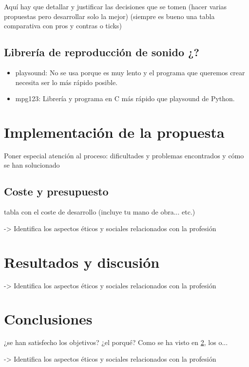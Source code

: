 \documentclass{article}
\begin{document}
 Aquí hay que detallar y justificar las decisiones que se tomen (hacer varias propuestas pero desarrollar solo la mejor) (siempre es bueno una tabla comparativa con pros y contras o ticks)
 
 \subsection{Librería de reproducción de sonido ¿?}
 \begin{itemize}
     \item playsound\cite{playsound}: No se usa porque es muy lento y el programa que queremos crear necesita ser lo más rápido posible.
     \item mpg123\cite{mpg123}: Librería y programa en C más rápido que playsound de Python.
 \end{itemize} 
 
 
\section{Implementación de la propuesta}

 Poner especial atención al proceso: dificultades y problemas encontrados y cómo se han solucionado
 
 
 \subsection{Coste y presupuesto}
  
  tabla con el coste de desarrollo (incluye tu mano de obra... etc.)
  
->  Identifica los aspectos éticos y sociales relacionados con la profesión

 
\section{Resultados y discusión}\label{sec:ResultadosDisc}

-> Identifica los aspectos éticos y sociales relacionados con la profesión

\section{Conclusiones}

 ¿se han satisfecho los objetivos? ¿el porqué? Como se ha visto en \ref{sec:ResultadosDisc}, los o...
 
-> Identifica los aspectos éticos y sociales relacionados con la profesión





\end{document}
